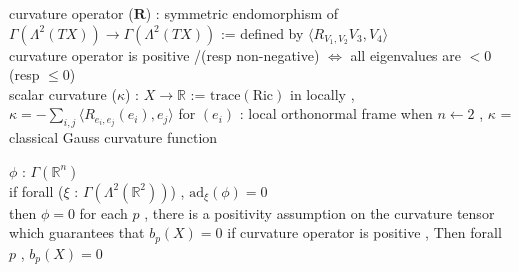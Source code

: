 \begin{Definition}
\itemdefi
  \Define curvature operator (\(\mathbf{R}\)) : symmetric endomorphism of \(\Gamma(\Lambda^2(TX)) \to \Gamma(\Lambda^2(TX))\) := defined by \(\langle R_{V_1 , V_2} V_3 , V_4 \rangle\) \\
  \Define curvature operator is positive /(resp non-negative) \(\iff\) all eigenvalues are \(< 0\) (resp \(\leq 0\)) \\
  \Define scalar curvature (\(\kappa\)) : \(X \to \mathbb{R}\) := \(\text{trace}(\text{Ric})\)
\itemprop
  in locally , \(\kappa = -\sum_{i,j} \langle R_{e_i , e_j}(e_i) , e_j \rangle\) for \((e_i)\) : local orthonormal frame
\itemprop
  when \(n \leftarrow 2\) , \(\kappa\) = classical Gauss curvature function
\end{Definition}

\begin{Theorem}
\itemprop
  \For \(\phi\) : \(\Gamma(\mathbb{R}^n)\) \\
  if forall (\(\xi\) : \(\Gamma(\Lambda^2(\mathbb{R}^2))\)) , \(\text{ad}_{\xi}(\phi) = 0\) \\
  then \(\phi = 0\)
\itemprop
  for each \(p\) ,
  there is a positivity assumption on the curvature tensor which guarantees that \(b_p(X) = 0\)
\itemprop
  if curvature operator is positive , Then forall \(p\) , \(b_p(X) = 0\)
\end{Theorem}

